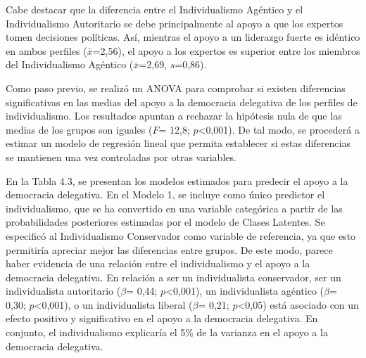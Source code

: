\documentclass[12pt,twoside]{templates/facsothesis}
\begin{document}
Cabe destacar que la diferencia entre el Individualismo Agéntico y el Individualismo Autoritario se debe principalmente al apoyo a que los expertos tomen decisiones políticas. Así, mientras el apoyo a un liderazgo fuerte es idéntico en ambos perfiles (\(\bar{x}\)=2,56), el apoyo a los expertos es superior entre los miembros del Individualismo Agéntico (\(\bar{x}\)=2,69, \(s\)=0,86).

Como paso previo, se realizó un ANOVA para comprobar si existen diferencias significativas en las medias del apoyo a la democracia delegativa de los perfiles de individualismo. Los resultados apuntan a rechazar la hipótesis nula de que las medias de los grupos son iguales (\(F\)= 12,8; \(p\)\textless0,001). De tal modo, se procederá a estimar un modelo de regresión lineal que permita establecer si estas diferencias se mantienen una vez controladas por otras variables.

En la Tabla 4.3, se presentan los modelos estimados para predecir el apoyo a la democracia delegativa. En el Modelo 1, se incluye como único predictor el individualismo, que se ha convertido en una variable categórica a partir de las probabilidades posteriores estimadas por el modelo de Clases Latentes. Se especificó al Individualismo Conservador como variable de referencia, ya que esto permitiría apreciar mejor las diferencias entre grupos. De este modo, parece haber evidencia de una relación entre el individualismo y el apoyo a la democracia delegativa. En relación a ser un individualista conservador, ser un individualista autoritario (\(\beta\)= 0,44; \(p\)\textless0,001), un individualista agéntico (\(\beta\)= 0,30; \(p\)\textless0,001), o un individualista liberal (\(\beta\)= 0,21; \(p\)\textless0,05) está asociado con un efecto positivo y significativo en el apoyo a la democracia delegativa. En conjunto, el individualismo explicaría el 5\% de la varianza en el apoyo a la democracia delegativa.
\end{document}
